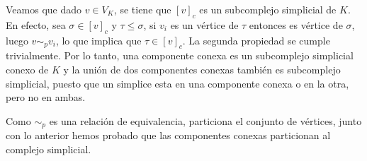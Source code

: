 \documentclass{article}
\begin{document}
\vspace{1mm}
\noindent Veamos que dado $v\in V_{K}$, se tiene que $[v]_{c}$ es un subcomplejo simplicial de 
$K$. En efecto, sea $\sigma\in[v]_{c}$ y $\tau\leq\sigma$, si $v_{i}$ es un vértice de $\tau$ 
entonces es vértice de $\sigma$, luego $v\sim_{p}v_{i}$, lo que implica que $\tau\in[v]_{c}$. La
segunda propiedad se cumple trivialmente. Por lo tanto, una componente conexa es un subcomplejo 
simplicial conexo de $K$ y la unión de dos componentes conexas también es subcomplejo simplicial, 
puesto que un simplice esta en una componente conexa o en la otra, pero no en ambas.

\vspace{1mm}
\noindent Como $\sim_{p}$ es una relación de equivalencia, particiona el conjunto de vértices,
junto con lo anterior hemos probado que las componentes conexas particionan al complejo 
simplicial.
\end{document}
